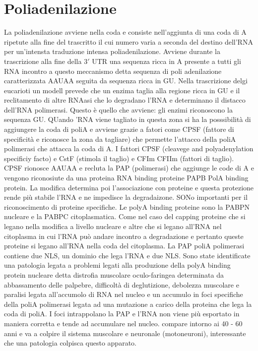\section{Poliadenilazione}
La poliadenilazione avviene nella coda e consiste nell'aggiunta di una coda di A ripetute alla fine del trascritto il cui numero varia a seconda del destino dell'RNA per un'intensta 
traduzione intensa poliadenilazione. Avviene durante la trascrizione alla fine della $3'$ UTR una sequenza ricca in A presente a tutti gli RNA incontro a questo meccanismo detta sequenza
di poli adenilazione caratterizzata AAUAA seguita da sequenza ricca in GU. Nella trascrizione delgi eucarioti un modell prevede che un enzima taglia alla regione ricca in GU e il 
reclitamento di altre RNAasi che lo degradano l'RNA e determinano il distacco dell'RNA polimerasi. Questo \`e quello che avviene: gli enzimi riconoscono la sequenza GU. QUando 'RNA
viene tagliato in questa zona si ha la posssibilit\`a di aggiungere la coda di poliA e avviene grazie a fatori come CPSF (fattore di specificit\`a e riconosce la zona da tagliare) che 
permette l'attacco della poliA polimerasi che attacca la coda di A. I fattori CPSF (cleavege and polyadenylation specificiy facto) e CstF (stimola il taglio) e CFIm CFIIm (fattori di
taglio). CPSF rionosce AAUAA e recluta la PAP (polimerasi) che aggiunge le code di A e vengono riconosiute da una proteina RNA binding proteine PAPB PolA binding protein. La modifica
determina poi l'associazione con proteine e questa protezione rende pi\`u stabile l'RNA e ne impedisce la degradaizone. SONo importanti per il riconoscimento di proteine specifiche.
Le polyA binding proteine sono la PABPN nucleare e la PABPC citoplasmatica. Come nel caso del capping proteine che si legano nella modifica a livello nucleare e altre che si legano 
all'RNA nel citoplasma in cui l'RNA pu\`o andare incontro a degradazione e pertanto queste proteine si legano all'RNA nella coda del citoplasma. La PAP poliA polimerasi contiene 
due NLS, un dominio che lega l'RNA e due NLS. Sono state identificate una patologia legata a problemi legati alla produzione della polyA binding protein nucleare detta distrofia muscolare
oculo-faringea determinata da abbassamento delle palpebre, difficolt\`a di deglutizione, debolezza muscolare e paralisi legata all'accumolo di RNA nel nucleo e un accumulo in foci 
specifiche della poliA polimerasi legata ad una mutazione a carico della proteina che lega la coda di poliA. I foci intrappolano la PAP e l'RNA non viene pi\`u esportato in maniera 
corretta e tende ad accumulare nel nucleo. compare intorno ai 40 - 60 anni e va a colpire il sistema muscolare e neuronale (motoneuroni), interessante che una patologia colpisca questo
apparato. 
